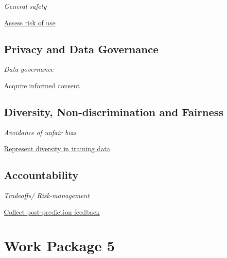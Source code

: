 \documentclass[
  letterpaper,
  DIV=11,
  numbers=noendperiod]{scrreport}
\begin{document}

\emph{General safety}

\protect\hyperlink{assess-risk-of-use}{Assess risk of use}

\hypertarget{privacy-and-data-governance-4}{%
\section*{Privacy and Data
Governance}\label{privacy-and-data-governance-4}}


\emph{Data governance}

\protect\hyperlink{acquire-informed-consent}{Acquire informed consent}

\hypertarget{diversity-non-discrimination-and-fairness-3}{%
\section*{Diversity, Non-discrimination and
Fairness}\label{diversity-non-discrimination-and-fairness-3}}


\emph{Avoidance of unfair bias}

\protect\hyperlink{represent-diversity-in-training-data}{Represent
diversity in training data}

\hypertarget{accountability-3}{%
\section*{Accountability}\label{accountability-3}}


\emph{Tradeoffs/ Risk-management}

\protect\hyperlink{collect-post-prediction-feedback}{Collect
post-prediction feedback}


\hypertarget{work-package-5}{%
\chapter*{Work Package 5}\label{work-package-5}}
\end{document}
